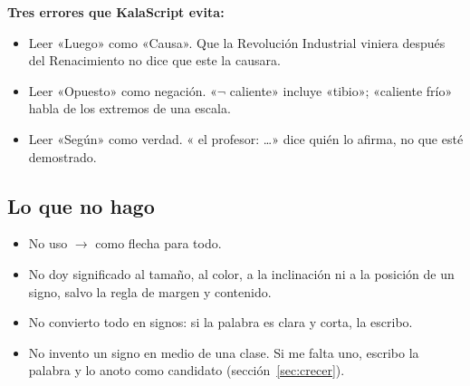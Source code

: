 \textbf{Tres errores que KalaScript evita:}
\begin{itemize}
\item Leer «Luego» como «Causa». Que la Revolución Industrial viniera después
 del Renacimiento no dice que este la causara.
\item Leer «Opuesto» como negación. «\(\neg\) caliente» incluye «tibio»;
 «caliente  frío» habla de los extremos de una escala.
\item Leer «Según» como verdad. « el profesor: \ldots» dice quién lo
 afirma, no que esté demostrado.
\end{itemize}

\subsection{Lo que no hago}
\begin{itemize}
\item No uso \(\to\) como flecha para todo.
\item No doy significado al tamaño, al color, a la inclinación ni a la posición
 de un signo, salvo la regla de margen y contenido.
\item No convierto todo en signos: si la palabra es clara y corta, la escribo.
\item No invento un signo en medio de una clase. Si me falta uno, escribo la
 palabra y lo anoto como candidato (sección~\ref{sec:crecer}).
\end{itemize}

